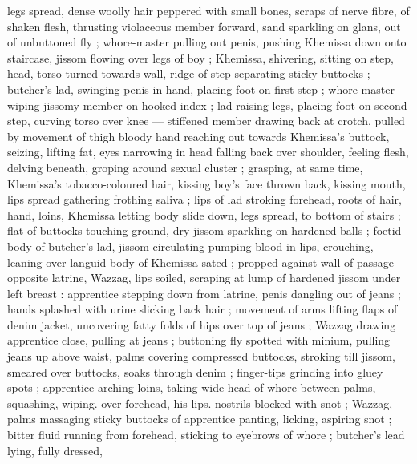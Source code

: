 legs spread, dense woolly hair peppered with small bones, scraps of nerve fibre, of shaken flesh, thrusting violaceous member forward, sand sparkling on glans, out of unbuttoned fly ; whore-master pulling out penis, pushing Khemissa down onto staircase, jissom flowing over legs of boy ; Khemissa, shivering, sitting on step, head, torso turned towards wall, ridge of step separating sticky buttocks ; butcher's lad, swinging penis in hand, placing foot on first step ; whore-master wiping jissomy member on hooked index ; lad raising legs, placing foot on second step, curving torso over knee --- stiffened member drawing back at crotch, pulled by movement of thigh {\dashcom} bloody hand reaching out towards Khemissa's buttock, seizing, lifting fat, eyes narrowing in head falling back over shoulder, feeling flesh, delving beneath, groping around sexual cluster ; grasping, at same time, Khemissa's tobacco-coloured hair, kissing boy's face thrown back, kissing mouth, lips spread gathering frothing saliva ; lips of lad stroking forehead, roots of hair, hand, loins, Khemissa letting body slide down, legs spread, to bottom of stairs ; flat of buttocks touching ground, dry jissom sparkling on hardened balls ; foetid body of butcher's lad, jissom circulating pumping blood in lips, crouching, leaning over languid body of Khemissa sated ; propped against wall of passage opposite latrine, Wazzag, lips soiled, scraping at lump of hardened jissom under left breast : apprentice stepping down from latrine, penis dangling out of jeans ; hands splashed with urine slicking back hair ; movement of arms lifting flaps of denim jacket, uncovering fatty folds of hips over top of jeans ; Wazzag drawing apprentice close, pulling at jeans ; buttoning fly spotted with minium, pulling jeans up above waist, palms covering compressed buttocks, stroking till jissom, smeared over buttocks, soaks through denim ; finger-tips grinding into gluey spots ; apprentice arching loins, taking wide head of whore between palms, squashing, wiping. over forehead, his lips. nostrils blocked with snot ; Wazzag, palms massaging sticky buttocks of apprentice panting, licking, aspiring snot ; bitter fluid running from forehead, sticking to eyebrows of whore ; butcher's lead lying, fully dressed,

